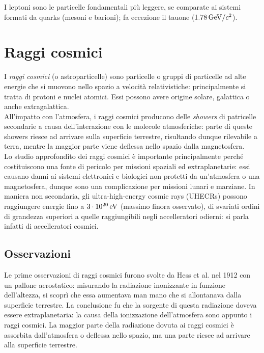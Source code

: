 
I leptoni sono le particelle fondamentali più leggere, se comparate ai sistemi formati da quarks (mesoni e barioni); fa eccezione il tauone ($ 1.78\,\mathrm{GeV}/c^2 $).

\section{Raggi cosmici}

I \textit{raggi cosmici} (o astroparticelle) sono particelle o gruppi di particelle ad alte energie che si muovono nello spazio a velocità relativistiche: principalmente si tratta di protoni e nuclei atomici. Essi possono avere origine solare, galattica o anche extragalattica.\\
All'impatto con l'atmosfera, i raggi cosmici producono delle \textit{showers} di patricelle secondarie a causa dell'interazione con le molecole atmosferiche: parte di queste showers riesce ad arrivare sulla superficie terrestre, risultando dunque rilevabile a terra, mentre la maggior parte viene deflessa nello spazio dalla magnetosfera.\\
Lo studio approfondito dei raggi cosmici è importante principalmente perché costituiscono una fonte di pericolo per missioni spaziali ed extraplanetarie: essi causano danni ai sistemi elettronici e biologici non protetti da un'atmosfera o una magnetosfera, dunque sono una complicazione  per missioni lunari e marziane. In maniera non secondaria, gli ultra-high-energy cosmic rays (UHECRs) possono raggiungere energie fino a $ 3\cdot10^{20}\,\mathrm{eV} $ (massimo finora osservato), di svariati ordini di grandezza superiori a quelle raggiungibili negli accelleratori odierni: si parla infatti di accelleratori cosmici.

\subsection{Osservazioni}

Le prime osservazioni di raggi cosmici furono svolte da Hess et al. nel 1912 con un pallone aerostatico: misurando la radiazione inonizzante in funzione dell'altezza, si scoprì che essa aumentava man mano che si allontanava dalla superficie terrestre. La conclusione fu che la sorgente di questa radiazione doveva essere extraplanetaria: la causa della ionizzazione dell'atmosfera sono appunto i raggi cosmici. La maggior parte della radiazione dovuta ai raggi cosmici è assorbita dall'atmosfera o deflessa nello spazio, ma una parte riesce ad arrivare alla superficie terrestre.


